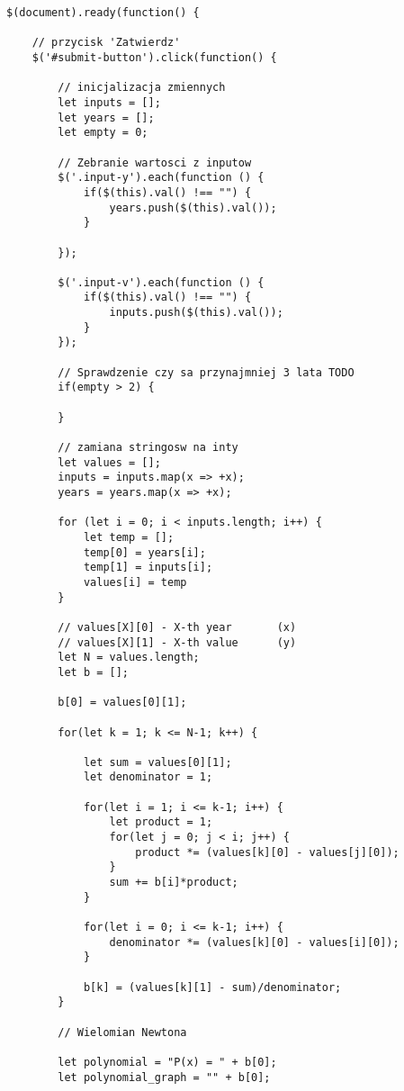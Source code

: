\documentclass[a4paper,12pt]{article}
\begin{document}
\begin{lstlisting}
$(document).ready(function() {

    // przycisk 'Zatwierdz'
    $('#submit-button').click(function() {

        // inicjalizacja zmiennych
        let inputs = [];
        let years = [];
        let empty = 0;

        // Zebranie wartosci z inputow
        $('.input-y').each(function () {
            if($(this).val() !== "") {
                years.push($(this).val());
            }

        });

        $('.input-v').each(function () {
            if($(this).val() !== "") {
                inputs.push($(this).val());
            }
        });

        // Sprawdzenie czy sa przynajmniej 3 lata TODO
        if(empty > 2) {

        }

        // zamiana stringosw na inty
        let values = [];
        inputs = inputs.map(x => +x);
        years = years.map(x => +x);

        for (let i = 0; i < inputs.length; i++) {
            let temp = [];
            temp[0] = years[i];
            temp[1] = inputs[i];
            values[i] = temp
        }

        // values[X][0] - X-th year       (x)
        // values[X][1] - X-th value      (y)
        let N = values.length;
        let b = [];

        b[0] = values[0][1];
    
        for(let k = 1; k <= N-1; k++) {

            let sum = values[0][1];
            let denominator = 1;

            for(let i = 1; i <= k-1; i++) {
                let product = 1;
                for(let j = 0; j < i; j++) {
                    product *= (values[k][0] - values[j][0]);
                }
                sum += b[i]*product;
            }

            for(let i = 0; i <= k-1; i++) {
                denominator *= (values[k][0] - values[i][0]);
            }

            b[k] = (values[k][1] - sum)/denominator;
        }

        // Wielomian Newtona

        let polynomial = "P(x) = " + b[0];
        let polynomial_graph = "" + b[0];


\end{lstlisting}
\end{document}
